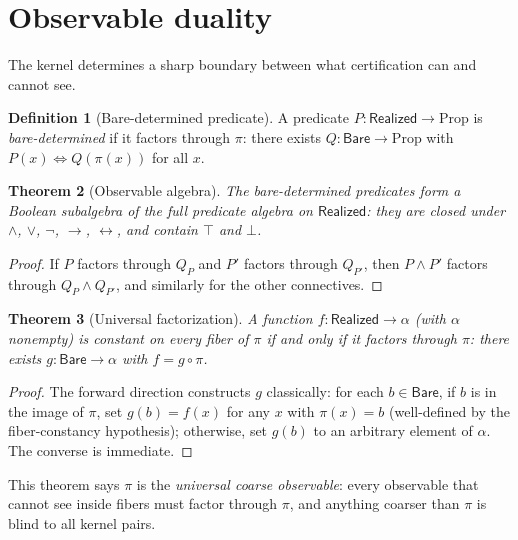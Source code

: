 \documentclass[11pt,a4paper]{article}
\theoremstyle{plain}
\newtheorem{theorem}{Theorem}[section]
\theoremstyle{definition}
\newtheorem{definition}[theorem]{Definition}
\theoremstyle{remark}
\newcommand{\Bare}{\mathsf{Bare}}
\newcommand{\Real}{\mathsf{Realized}}
\newcommand{\compare}{\pi}
\begin{document}
\section{Observable duality}\label{sec:observable}

The kernel determines a sharp boundary between what certification can and
cannot see.

\begin{definition}[Bare-determined predicate]\label{def:bare-det}
A predicate $P : \Real \to \mathrm{Prop}$ is \emph{bare-determined} if it
factors through $\compare$: there exists $Q : \Bare \to \mathrm{Prop}$ with
$P(x) \Leftrightarrow Q(\compare(x))$ for all $x$.
\end{definition}

\begin{theorem}[Observable algebra]\label{thm:obs-algebra}
The bare-determined predicates form a Boolean subalgebra of the full predicate
algebra on $\Real$: they are closed under $\land$, $\lor$, $\lnot$, $\to$,
$\leftrightarrow$, and contain $\top$ and $\bot$.
\end{theorem}

\begin{proof}
If $P$ factors through $Q_P$ and $P'$ factors through $Q_{P'}$, then
$P \land P'$ factors through $Q_P \land Q_{P'}$, and similarly for the
other connectives.
\end{proof}

\begin{theorem}[Universal factorization]\label{thm:univ-factor}
A function $f : \Real \to \alpha$ (with $\alpha$ nonempty) is constant on
every fiber of $\compare$ if and only if it factors through $\compare$:
there exists $g : \Bare \to \alpha$ with $f = g \circ \compare$.
\end{theorem}

\begin{proof}
The forward direction constructs $g$ classically: for each $b \in \Bare$,
if $b$ is in the image of $\compare$, set $g(b) = f(x)$ for any $x$ with
$\compare(x) = b$ (well-defined by the fiber-constancy hypothesis);
otherwise, set $g(b)$ to an arbitrary element of $\alpha$.
The converse is immediate.
\end{proof}

This theorem says $\compare$ is the \emph{universal coarse observable}:
every observable that cannot see inside fibers must factor through $\compare$,
and anything coarser than $\compare$ is blind to all kernel pairs.
\end{document}
